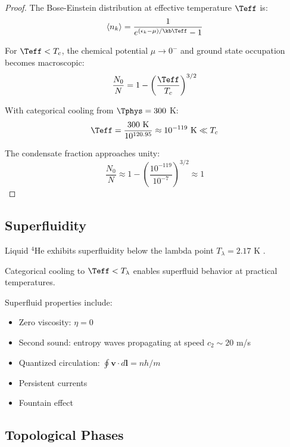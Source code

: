 \begin{proof}
The Bose-Einstein distribution at effective temperature $\Teff$ is:
\begin{equation}
\langle n_k \rangle = \frac{1}{e^{(\epsilon_k - \mu)/\kb \Teff} - 1}
\end{equation}

For $\Teff < T_c$, the chemical potential $\mu \to 0^-$ and ground state occupation becomes macroscopic:
\begin{equation}
\frac{N_0}{N} = 1 - \left(\frac{\Teff}{T_c}\right)^{3/2}
\end{equation}

With categorical cooling from $\Tphys = 300$ K:
\begin{equation}
\Teff = \frac{300 \text{ K}}{10^{120.95}} \approx 10^{-119} \text{ K} \ll T_c
\end{equation}

The condensate fraction approaches unity:
\begin{equation}
\frac{N_0}{N} \approx 1 - \left(\frac{10^{-119}}{10^{-7}}\right)^{3/2} \approx 1
\end{equation}
\end{proof}

\subsection{Superfluidity}

Liquid $^4$He exhibits superfluidity below the lambda point $T_\lambda = 2.17$ K \cite{kapitza1938,allen1938}.

\begin{theorem}
\label{thm:superfluidity}
Categorical cooling to $\Teff < T_\lambda$ enables superfluid behavior at practical temperatures.
\end{theorem}

Superfluid properties include:
\begin{itemize}
    \item Zero viscosity: $\eta = 0$
    \item Second sound: entropy waves propagating at speed $c_2 \sim 20$ m/s
    \item Quantized circulation: $\oint \mathbf{v} \cdot d\mathbf{l} = nh/m$
    \item Persistent currents
    \item Fountain effect
\end{itemize}

\subsection{Topological Phases}

